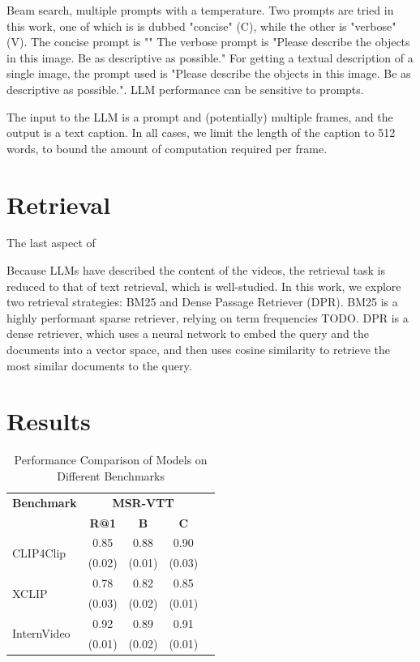 \documentclass{article}
\begin{document}
Beam search, multiple prompts with a temperature.
Two prompts are tried in this work, one of which is is dubbed "concise" (C), while the other is "verbose" (V).
The concise prompt is ""
The verbose prompt is "Please describe the objects in this image. Be as descriptive as possible."
For getting a textual description of a single image, the prompt used is "Please describe the objects in this image. Be as descriptive as possible.".
LLM performance can be sensitive to prompts.

The input to the LLM is a prompt and (potentially) multiple frames, and the output is a text caption.
In all cases, we limit the length of the caption to 512 words, to bound the amount of computation required per frame.

\section{Retrieval}

The last aspect of 

Because LLMs have described the content of the videos, the retrieval task is reduced to that of text retrieval, which is well-studied.
In this work, we explore two retrieval strategies: BM25 and Dense Passage Retriever (DPR).
BM25 is a highly performant sparse retriever, relying on term frequencies TODO.
DPR is a dense retriever, which uses a neural network to embed the query and the documents into a vector space, and then uses cosine similarity to retrieve the most similar documents to the query.

\section{Results}

\begin{table}[htbp]
  \centering
  \begin{tabular}{lcccc}
    \toprule
    \textbf{Benchmark} & \multicolumn{3}{c}{\textbf{MSR-VTT}} \\
    \cmidrule(lr){2-4}
    & \textbf{R@1} & \textbf{B} & \textbf{C} \\
    \midrule
    \multirow{2}{*}{CLIP4Clip} & 0.85 & 0.88 & 0.90 \\
    & (0.02) & (0.01) & (0.03) \\
    \midrule
    \multirow{2}{*}{XCLIP} & 0.78 & 0.82 & 0.85 \\
    & (0.03) & (0.02) & (0.01) \\
    \midrule
    \multirow{2}{*}{InternVideo} & 0.92 & 0.89 & 0.91 \\
    & (0.01) & (0.02) & (0.01) \\
    \bottomrule
  \end{tabular}
  \label{tab:model_comparison}
  \caption{Performance Comparison of Models on Different Benchmarks}
\end{table}
\end{document}
